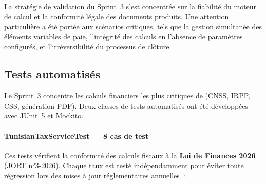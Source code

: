 La stratégie de validation du Sprint~3 s'est concentrée sur la fiabilité
du moteur de calcul et la conformité légale des documents produits. Une
attention particulière a été portée aux scénarios critiques, tels que
la gestion simultanée des éléments variables de paie, l'intégrité des
calculs en l'absence de paramètres configurés, et l'irréversibilité du
processus de clôture.

\subsection{Tests automatisés}

Le Sprint~3 concentre les calculs financiers les plus critiques de \pz{}
(CNSS, IRPP, CSS, génération PDF). Deux classes de tests automatisés ont
été développées avec JUnit~5 et Mockito.

\paragraph{TunisianTaxServiceTest --- 8 cas de test}
Ces tests vérifient la conformité des calculs fiscaux à la
\textbf{Loi de Finances 2026} (JORT n°3-2026). Chaque taux est testé
indépendamment pour éviter toute régression lors des mises à jour réglementaires
annuelles~:

